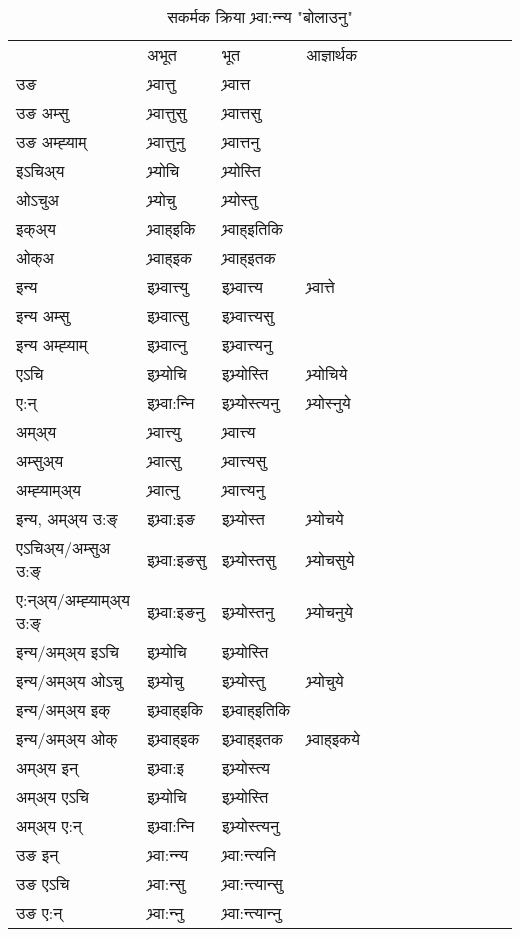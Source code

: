 \begin{table}[H]
\label{ott.vt} \centering
\caption{सकर्मक क्रिया  भ्र्वा:न्‍न्य  "बोलाउनु"  }
\begin{tabular}{l|l|l|l|l|l|l|l|l|l|l|l|l}  \toprule
&अभूत & भूत & आज्ञार्थक \\ 
उङ &भ्र्वात्तु &भ्र्वात्त \\ 
उङ अम्सु&भ्र्वात्तुसु &भ्र्वात्तसु \\ 
उङ अम्ह्‍याम्&भ्र्वात्तुनु &भ्र्वात्तनु \\ 
इऽचिअ्य &भ्र्योचि &भ्र्योस्ति   \\ 
ओऽचुअ        &भ्र्योचु &भ्र्योस्तु   \\ 
इक्अ्य&भ्र्वाह्इकि &भ्र्वाह्इतिकि   \\ 
ओक्अ &भ्र्वाह्इक &भ्र्वाह्इतक   \\ 
इन्य & इभ्र्वात्त्यु  & इभ्र्वात्त्य &भ्र्वात्ते  \\ 
इन्य अम्सु& इभ्र्वात्सु  & इभ्र्वात्त्यसु   \\ 
इन्य अम्ह्‍याम्& इभ्र्वात्‍नु  & इभ्र्वात्त्यनु   \\ 
एऽचि & इभ्र्योचि & इभ्र्योस्ति &भ्र्योचिये    \\ 
ए:न् & इभ्र्वा:न्‍नि  & इभ्र्योस्त्यनु &भ्र्योस्‍नुये  \\ 
अम्अ्य & भ्र्वात्त्यु  & भ्र्वात्त्य  \\ 
अम्सुअ्य & भ्र्वात्सु & भ्र्वात्त्यसु  \\ 
अम्ह्‍याम्अ्य & भ्र्वात्‍नु  & भ्र्वात्त्यनु \\ 
\midrule
इन्य, अम्अ्य उ:ङ्‌ &इभ्र्वा:इङ &इभ्र्योस्त &भ्र्योचये \\ 
एऽचिअ्य/अम्सुअ उ:ङ्‌ &इभ्र्वा:इङसु &इभ्र्योस्तसु &भ्र्योचसुये \\ 
ए:न्अ्य/अम्ह्‍याम्अ्य उ:ङ्‌ &इभ्र्वा:इङनु &इभ्र्योस्तनु &भ्र्योचनुये \\ 
इन्य/अम्अ्य इऽचि &इभ्र्योचि &इभ्र्योस्ति    \\ 
इन्य/अम्अ्य ओऽचु &इभ्र्योचु &इभ्र्योस्तु  &भ्र्योचुये  \\ 
इन्य/अम्अ्य इक् &इभ्र्वाह्इकि &इभ्र्वाह्इतिकि   \\ 
इन्य/अम्अ्य ओक् &इभ्र्वाह्इक &इभ्र्वाह्इतक  &भ्र्वाह्इकये  \\ 
अम्अ्य इन् & इभ्र्वा:इ & इभ्र्योस्त्य   \\ 
अम्अ्य एऽचि & इभ्र्योचि & इभ्र्योस्ति    \\ 
अम्अ्य ए:न् & इभ्र्वा:न्‍नि  & इभ्र्योस्त्यनु  \\ 
\midrule
उङ इन् & भ्र्वा:न्‍न्य  & भ्र्वा:न्त्यनि  \\ 
उङ एऽचि & भ्र्वा:न्सु  & भ्र्वा:न्त्यान्सु   \\ 
उङ ए:न्& भ्र्वा:न्‍नु  & भ्र्वा:न्त्यान्‍नु   \\ 
\bottomrule
\end{tabular}
\end{table}


